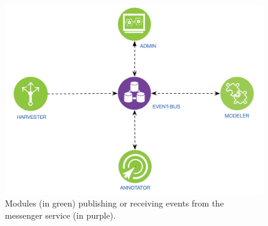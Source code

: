 \begin{figure} 
  \center
  \includegraphics[scale=0.45]{modules}
  \caption{Modules (in green) publishing or receiving events from the messenger service (in purple).}
  \label{fig:librairy-modules}
\end{figure}


